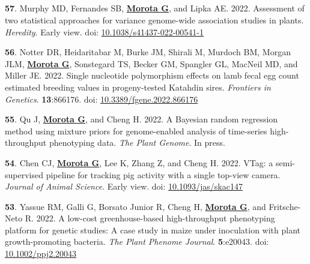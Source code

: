 \documentclass[margin,line,10pt]{res}
\newenvironment{list1}{
  \begin{list}{\ding{113}}{%
      \setlength{\itemsep}{0in}
      \setlength{\parsep}{0in} \setlength{\parskip}{0in}
      \setlength{\topsep}{0in} \setlength{\partopsep}{0in} 
      \setlength{\leftmargin}{0.17in}}}{\end{list}}
\begin{document}
\begin{resume}
\section{}
\begin{list1}

             
   \item [{\bf 57}.] Murphy MD, Fernandes SB, \textbf{\underline{Morota G}}, and Lipka AE. 2022. Assessment of two statistical approaches for variance genome-wide association studies in plants. \emph{Heredity}. Early view. doi: \textcolor{blue}{\href{https://doi.org/10.1038/s41437-022-00541-1}{10.1038/s41437-022-00541-1}}  


      \vspace{0.5cm}
     
       \item  [{\bf 56}.]  Notter DR, Heidaritabar M, Burke JM, Shirali M, Murdoch BM, Morgan JLM, \textbf{\underline{Morota G}}, Sonstegard TS, Becker GM, Spangler GL, MacNeil MD, and Miller JE. 2022. Single nucleotide polymorphism effects on lamb fecal egg count estimated breeding values in progeny-tested Katahdin sires. \emph{Frontiers in Genetics}. \textbf{13}:866176. doi: \textcolor{blue}{\href{https://doi.org/10.3389/fgene.2022.866176}{10.3389/fgene.2022.866176}}       

        
         
         \vspace{0.5cm}

\item  [{\bf 55}.] Qu J, \textbf{\underline{Morota G}}, and Cheng H. 2022. A Bayesian random regression method using mixture priors for genome-enabled analysis of time-series high-throughput phenotyping data.  \emph{The Plant Genome}. In press. 

  \vspace{0.5cm}


\item [{\bf 54}.]  Chen CJ, \textbf{\underline{Morota G}}, Lee K, Zhang Z, and Cheng H. 2022. VTag: a semi-supervised pipeline for tracking pig activity with a single top-view camera. \emph{Journal of Animal Science}. Early view. doi: \textcolor{blue}{\href{https://doi.org/10.1093/jas/skac147}{10.1093/jas/skac147}}  

    \vspace{0.5cm}


\item [{\bf 53}.] Yassue RM, Galli G, Borsato Junior R, Cheng H, \textbf{\underline{Morota G}}, and Fritsche-Neto R. 2022. A low-cost greenhouse-based high-throughput phenotyping platform for genetic studies: A case study in maize under inoculation with plant growth-promoting bacteria. \emph{The Plant Phenome Journal}. \textbf{5}:e20043. doi: \textcolor{blue}{\href{https://doi.org/10.1002/ppj2.20043}{10.1002/ppj2.20043}}  
  

\end{list1}
\end{resume}
\end{document}
